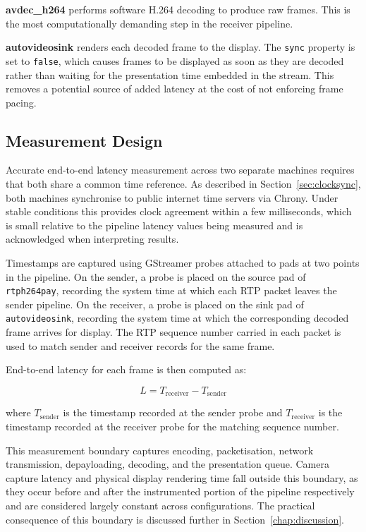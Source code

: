 \textbf{avdec\_h264} performs software H.264 decoding to produce raw frames. This is the most computationally demanding step in the receiver pipeline.

\textbf{autovideosink} renders each decoded frame to the display. The \texttt{sync} property is set to \texttt{false}, which causes frames to be displayed as soon as they are decoded rather than waiting for the presentation time embedded in the stream. This removes a potential source of added latency at the cost of not enforcing frame pacing.


\subsection{Measurement Design}\label{sec:measurementdesign}

Accurate end-to-end latency measurement across two separate machines requires that both share a common time reference. As described in Section~\ref{sec:clocksync}, both machines synchronise to public internet time servers via Chrony. Under stable conditions this provides clock agreement within a few milliseconds, which is small relative to the pipeline latency values being measured and is acknowledged when interpreting results.

Timestamps are captured using GStreamer probes attached to pads at two points in the pipeline. On the sender, a probe is placed on the source pad of \texttt{rtph264pay}, recording the system time at which each RTP packet leaves the sender pipeline. On the receiver, a probe is placed on the sink pad of \texttt{autovideosink}, recording the system time at which the corresponding decoded frame arrives for display. The RTP sequence number carried in each packet is used to match sender and receiver records for the same frame.

End-to-end latency for each frame is then computed as:

\begin{equation}
  L = T_{\text{receiver}} - T_{\text{sender}}
\end{equation}

where $T_{\text{sender}}$ is the timestamp recorded at the sender probe and $T_{\text{receiver}}$ is the timestamp recorded at the receiver probe for the matching sequence number.

This measurement boundary captures encoding, packetisation, network transmission, depayloading, decoding, and the presentation queue. Camera capture latency and physical display rendering time fall outside this boundary, as they occur before and after the instrumented portion of the pipeline respectively and are considered largely constant across configurations. The practical consequence of this boundary is discussed further in Section~\ref{chap:discussion}.


